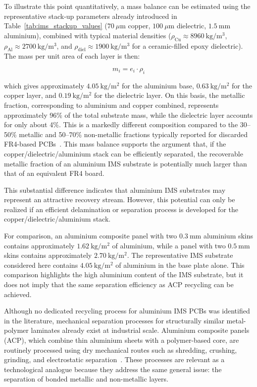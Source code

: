 To illustrate this point quantitatively, a mass balance can be estimated using the representative stack-up parameters already introduced in Table~\ref{tab:ims_stackup_values} (\(70~\mu\mathrm{m}\) copper, \(100~\mu\mathrm{m}\) dielectric, \(1.5~\mathrm{mm}\) aluminium), combined with typical material densities (\(\rho_{\mathrm{Cu}} \approx 8960~\mathrm{kg/m^3}\), \(\rho_{\mathrm{Al}} \approx 2700~\mathrm{kg/m^3}\), and \(\rho_{\mathrm{diel}} \approx 1900~\mathrm{kg/m^3}\) for a ceramic-filled epoxy dielectric). The mass per unit area of each layer is then:

\begin{equation}
m_i = e_i \cdot \rho_i
\end{equation}

which gives approximately \(4.05~\mathrm{kg/m^2}\) for the aluminium base, \(0.63~\mathrm{kg/m^2}\) for the copper layer, and \(0.19~\mathrm{kg/m^2}\) for the dielectric layer. On this basis, the metallic fraction, corresponding to aluminium and copper combined, represents approximately 96\% of the total substrate mass, while the dielectric layer accounts for only about 4\%. This is a markedly different composition compared to the 30--50\% metallic and 50--70\% non-metallic fractions typically reported for discarded FR4-based PCBs~\cite{dpcb_review_2024}. This mass balance supports the argument that, if the copper/dielectric/aluminium stack can be efficiently separated, the recoverable metallic fraction of an aluminium IMS substrate is potentially much larger than that of an equivalent FR4 board.

This substantial difference indicates that aluminium IMS substrates may represent an attractive recovery stream. However, this potential can only be realized if an efficient delamination or separation process is developed for the copper/dielectric/aluminium stack.

For comparison, an aluminium composite panel with two \(0.3~\mathrm{mm}\) aluminium skins contains approximately \(1.62~\mathrm{kg/m^2}\) of aluminium, while a panel with two \(0.5~\mathrm{mm}\) skins contains approximately \(2.70~\mathrm{kg/m^2}\). The representative IMS substrate considered here contains \(4.05~\mathrm{kg/m^2}\) of aluminium in the base plate alone. This comparison highlights the high aluminium content of the IMS substrate, but it does not imply that the same separation efficiency as ACP recycling can be achieved.

Although no dedicated recycling process for aluminium IMS PCBs was identified in the literature, mechanical separation processes for structurally similar metal-polymer laminates already exist at industrial scale. Aluminium composite panels (ACP), which combine thin aluminium sheets with a polymer-based core, are routinely processed using dry mechanical routes such as shredding, crushing, grinding, and electrostatic separation~\cite{acp_separation}. These processes are relevant as a technological analogue because they address the same general issue: the separation of bonded metallic and non-metallic layers.

